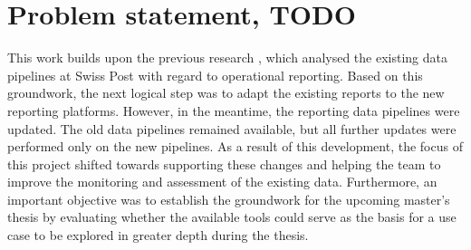 
\section{Problem statement, TODO}
\label{ResearchProblemState}

This work builds upon the previous research \cite{Roccaro2026_Project1}, which analysed the existing data pipelines at Swiss Post with regard to operational reporting. Based on this groundwork, the next logical step was to adapt the existing reports to the new reporting platforms. However, in the meantime, the reporting data pipelines were updated. The old data pipelines remained available, but all further updates were performed only on the new pipelines. As a result of this development, the focus of this project shifted towards supporting these changes and helping the team to improve the monitoring and assessment of the existing data. Furthermore, an important objective was to establish the groundwork for the upcoming master's thesis by evaluating whether the available tools could serve as the basis for a use case to be explored in greater depth during the thesis.

